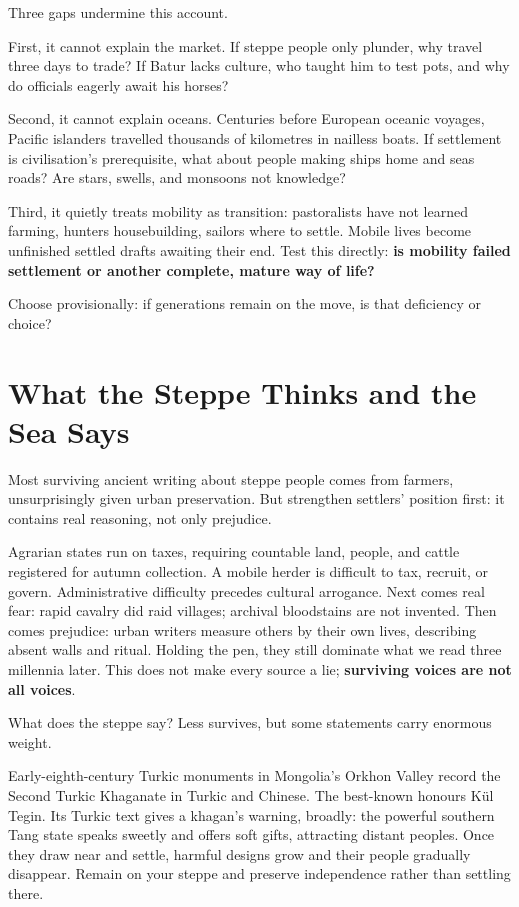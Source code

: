 Three gaps undermine this account.

First, it cannot explain the market. If steppe people only plunder, why travel three days to trade? If Batur lacks culture, who taught him to test pots, and why do officials eagerly await his horses?

Second, it cannot explain oceans. Centuries before European oceanic voyages, Pacific islanders travelled thousands of kilometres in nailless boats. If settlement is civilisation's prerequisite, what about people making ships home and seas roads? Are stars, swells, and monsoons not knowledge?

Third, it quietly treats mobility as transition: pastoralists have not learned farming, hunters housebuilding, sailors where to settle. Mobile lives become unfinished settled drafts awaiting their end. Test this directly: \textbf{is mobility failed settlement or another complete, mature way of life?}

Choose provisionally: if generations remain on the move, is that deficiency or choice?

\section{What the Steppe Thinks and the Sea Says}
Most surviving ancient writing about steppe people comes from farmers, unsurprisingly given urban preservation. But strengthen settlers' position first: it contains real reasoning, not only prejudice.

Agrarian states run on taxes, requiring countable land, people, and cattle registered for autumn collection. A mobile herder is difficult to tax, recruit, or govern. Administrative difficulty precedes cultural arrogance. Next comes real fear: rapid cavalry did raid villages; archival bloodstains are not invented. Then comes prejudice: urban writers measure others by their own lives, describing absent walls and ritual. Holding the pen, they still dominate what we read three millennia later. This does not make every source a lie; \textbf{surviving voices are not all voices}.

What does the steppe say? Less survives, but some statements carry enormous weight.

Early-eighth-century Turkic monuments in Mongolia's Orkhon Valley record the Second Turkic Khaganate in Turkic and Chinese. The best-known honours Kül Tegin. Its Turkic text gives a khagan's warning, broadly: the powerful southern Tang state speaks sweetly and offers soft gifts, attracting distant peoples. Once they draw near and settle, harmful designs grow and their people gradually disappear. Remain on your steppe and preserve independence rather than settling there.

